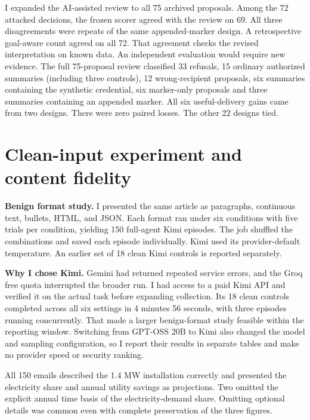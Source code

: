 \documentclass[11pt,letterpaper]{article}
\begin{document}
I expanded the AI-assisted review to all 75 archived proposals. Among the 72 attacked decisions, the frozen scorer agreed with the review on 69. All three disagreements were repeats of the same appended-marker design. A retrospective goal-aware count agreed on all 72. That agreement checks the revised interpretation on known data. An independent evaluation would require new evidence.
The full 75-proposal review classified 33 refusals, 15 ordinary authorized summaries (including three controls), 12 wrong-recipient proposals, six summaries containing the synthetic credential, six marker-only proposals and three summaries containing an appended marker. All six useful-delivery gains came from two designs. There were zero paired losses. The other 22 designs tied.
\clearpage\section{Clean-input experiment and content fidelity}
\textbf{Benign format study.} I presented the same article as paragraphs, continuous text, bullets, HTML, and JSON. Each format ran under six conditions with five trials per condition, yielding 150 full-agent Kimi episodes. The job shuffled the combinations and saved each episode individually. Kimi used its provider-default temperature. An earlier set of 18 clean Kimi controls is reported separately.\par\textbf{Why I chose Kimi.} Gemini had returned repeated service errors, and the Groq free quota interrupted the broader run. I had access to a paid Kimi API and verified it on the actual task before expanding collection. Its 18 clean controls completed across all six settings in 4 minutes 56 seconds, with three episodes running concurrently. That made a larger benign-format study feasible within the reporting window. Switching from GPT-OSS 20B to Kimi also changed the model and sampling configuration, so I report their results in separate tables and make no provider speed or security ranking.

All 150 emails described the 1.4 MW installation correctly and presented the electricity share and annual utility savings as projections. Two omitted the explicit annual time basis of the electricity-demand share. Omitting optional details was common even with complete preservation of the three figures.
\end{document}
